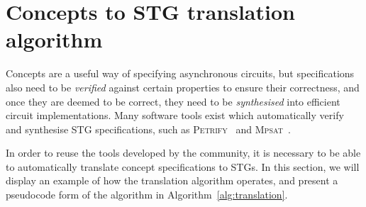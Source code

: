 \documentclass[british,conference,compsoc]{IEEEtran}
\newcommand{\noun}[1]{\textsc{#1}}
\begin{document}
%  
%
%  
%
%
%

\section{Concepts to STG translation algorithm\label{sec:algorithm}}

\vspace{-2mm}

Concepts are a useful way of specifying asynchronous circuits, but
specifications also need to be \emph{verified} against certain properties to
ensure their correctness, and once they are deemed to be correct, they need to
be \emph{synthesised} into efficient circuit implementations. Many software
tools exist which automatically verify and synthesise STG specifications,
such as \noun{Petrify}~\cite{Cortadella} and
\noun{Mpsat}~\cite{khomenko2004detecting}.

In order to reuse the tools developed by the community, it is
necessary to be able to automatically translate concept specifications to STGs.
In this section, we will display an example of how the translation algorithm 
operates, and present a pseudocode form of the algorithm in 
Algorithm~\ref{alg:translation}. 
\end{document}
